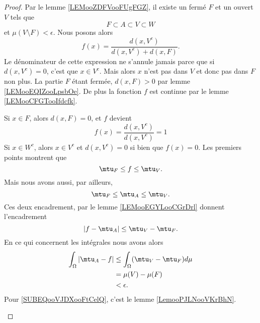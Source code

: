 \begin{proof}
	Par le lemme \ref{LEMooZDFVooFUgFGZ}, il existe un fermé \( F\) et un ouvert \( V\) tels que
	\begin{equation}
		F\subset A\subset V\subset W
	\end{equation}
	et \( \mu(V\setminus F)<\epsilon\). Nous posons alors
	\begin{equation}
		f(x)=\frac{ d(x,V^c) }{ d(x,V^c)+d(x,F) }.
	\end{equation}
	Le dénominateur de cette expression ne s'annule jamais parce que si \( d(x,V^c)=0\), c'est que \( x\in V^c\). Mais alors \( x\) n'est pas dans \( V\) et donc pas dans \( F\) non plus. La partie \( F\) étant fermée, \( d(x,F)>0\) par lemme \ref{LEMooEQIZooLpsbOe}. De plus la fonction \( f\) est continue par le lemme \ref{LEMooCFGTooIfdcfk}.

	\begin{subproof}
		Si \( x\in F\), alors \( d(x,F)=0\), et \( f\) devient
		\begin{equation}
			f(x)=\frac{ d(x,V^c) }{ d(x,V^c) }=1
		\end{equation}
		Si \( x\in W^c\), alors \( x\in V^c\) et \( d(x,V^c)=0\) si bien que \( f(x)=0\).
		Les premiers points montrent que
		\begin{equation}
			\mtu_F\leq f\leq \mtu_V.
		\end{equation}
		Mais nous avons aussi, par ailleurs,
		\begin{equation}
			\mtu_{F}\leq \mtu_A\leq \mtu_V.
		\end{equation}
		Ces deux encadrement, par le lemme \ref{LEMooEGYLooCGrDrl} donnent l'encadrement
		\begin{equation}
			| f-\mtu_A |\leq \mtu_V-\mtu_F.
		\end{equation}
		En ce qui concernent les intégrales nous avons alors
		\begin{subequations}
			\begin{align}
				\int_{\Omega}| \mtu_A-f | & \leq \int_{\Omega}(\mtu_V-\mtu_F)d\mu      \\
				                          & =\mu(V)-\mu(F) \label{SUBEQooVJDXooFtCelQ} \\
				                          & <\epsilon.
			\end{align}
		\end{subequations}
		Pour \eqref{SUBEQooVJDXooFtCelQ}, c'est le lemme \ref{LemooPJLNooVKrBhN}.
	\end{subproof}
\end{proof}

